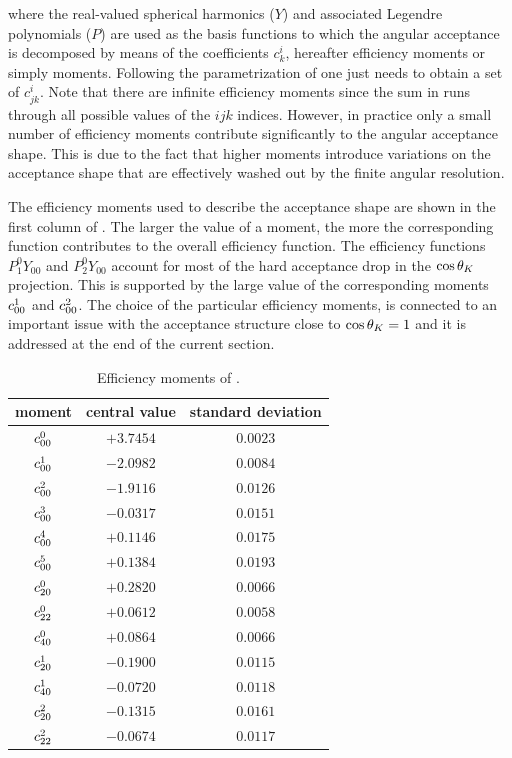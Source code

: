 \noindent where the real-valued spherical harmonics ($Y$) and associated Legendre polynomials ($P$) are used as the basis
functions to which the angular acceptance is decomposed by means of the coefficients $c^i_{k}$, hereafter efficiency moments or simply moments.
Following the parametrization of  one just needs to obtain a set of $c^i_{jk}$. Note that there are \aprior infinite efficiency moments
since the sum in  runs through all possible values of the $ijk$ indices. However, in practice only a small number of efficiency moments
contribute significantly to the angular acceptance shape. This is due to the fact that higher moments introduce
variations on the acceptance shape that are effectively washed out by the finite angular resolution.

The efficiency moments used to describe the acceptance shape are shown in the first column of .
The larger the value of a moment, the more the corresponding function contributes to the overall efficiency function.
The efficiency functions $P_1^0Y_{00}$ and $P_2^0Y_{00}$ account for most of the hard acceptance drop in the $\cos\theta_{K}$ projection.
This is supported by the large value of the corresponding moments $c^{1}_{00}$ and $c^{2}_{00}$.
The choice of the particular efficiency moments, is connected to an important
issue with the acceptance structure close to $\cos\theta_{K}=1$ and it is addressed at the end of the current section.

\begin{table}[!t]
  \centering
  \renewcommand{\arraystretch}{1.2}
  \begin{tabular}{ccc}
    \hline
    moment & central value & standard deviation \\
    \hline
  $c^{0}_{00}$   & $+3.7454$  &  $0.0023$  \\
  $c^{1}_{00}$   & $-2.0982$  &  $0.0084$  \\
  $c^{2}_{00}$   & $-1.9116$  &  $0.0126$  \\
  $c^{3}_{00}$   & $-0.0317$  &  $0.0151$  \\
  $c^{4}_{00}$   & $+0.1146$  &  $0.0175$  \\
  $c^{5}_{00}$   & $+0.1384$  &  $0.0193$  \\
  $c^{0}_{20}$   & $+0.2820$  &  $0.0066$  \\
  $c^{0}_{22}$   & $+0.0612$  &  $0.0058$  \\
  $c^{0}_{40}$   & $+0.0864$  &  $0.0066$  \\
  $c^{1}_{20}$   & $-0.1900$  &  $0.0115$  \\
  $c^{1}_{40}$   & $-0.0720$  &  $0.0118$  \\
  $c^{2}_{20}$   & $-0.1315$  &  $0.0161$  \\
  $c^{2}_{22}$   & $-0.0674$  &  $0.0117$  \\
  \hline
  \end{tabular}
  \caption{Efficiency moments of \BsJpsiKst.}
   \label{eff_moms_table}
\end{table}

